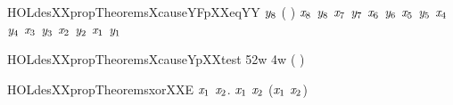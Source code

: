 \begin{SaveVerbatim}{HOLdesXXpropTheoremsXcauseYFpXXeqYY}
     \ensuremath{\HOLFreeVar{y}\sb{\mathrm{8}}} \HOLSymConst{=} ( \HOLSymConst{\HOLTokenExtract{}} )  \HOLSymConst{\HOLTokenImp{}}
        \HOLSymConst{=}
      \ensuremath{\HOLFreeVar{x}\sb{\mathrm{8}}} \ensuremath{\HOLFreeVar{y}\sb{\mathrm{8}}}  \HOLSymConst{\HOLTokenProd{}}  \ensuremath{\HOLFreeVar{x}\sb{\mathrm{7}}} \ensuremath{\HOLFreeVar{y}\sb{\mathrm{7}}}  \HOLSymConst{\HOLTokenProd{}}  \ensuremath{\HOLFreeVar{x}\sb{\mathrm{6}}} \ensuremath{\HOLFreeVar{y}\sb{\mathrm{6}}}  \HOLSymConst{\HOLTokenProd{}}
      \ensuremath{\HOLFreeVar{x}\sb{\mathrm{5}}} \ensuremath{\HOLFreeVar{y}\sb{\mathrm{5}}}  \HOLSymConst{\HOLTokenProd{}}  \ensuremath{\HOLFreeVar{x}\sb{\mathrm{4}}} \ensuremath{\HOLFreeVar{y}\sb{\mathrm{4}}}  \HOLSymConst{\HOLTokenProd{}}  \ensuremath{\HOLFreeVar{x}\sb{\mathrm{3}}} \ensuremath{\HOLFreeVar{y}\sb{\mathrm{3}}}  \HOLSymConst{\HOLTokenProd{}}
      \ensuremath{\HOLFreeVar{x}\sb{\mathrm{2}}} \ensuremath{\HOLFreeVar{y}\sb{\mathrm{2}}}  \HOLSymConst{\HOLTokenProd{}}  \ensuremath{\HOLFreeVar{x}\sb{\mathrm{1}}} \ensuremath{\HOLFreeVar{y}\sb{\mathrm{1}}} 
\end{SaveVerbatim}
\newcommand{\HOLdesXXpropTheoremsXcauseYFpXXeqYY}{\UseVerbatim{HOLdesXXpropTheoremsXcauseYFpXXeqYY}}
\begin{SaveVerbatim}{HOLdesXXpropTheoremsXcauseYpXXtest}
\HOLTokenTurnstile{}  52w 4w  ( \HOLSymConst{/} )
\end{SaveVerbatim}
\newcommand{\HOLdesXXpropTheoremsXcauseYpXXtest}{\UseVerbatim{HOLdesXXpropTheoremsXcauseYpXXtest}}
\begin{SaveVerbatim}{HOLdesXXpropTheoremsxorXXE}
\HOLTokenTurnstile{} \HOLSymConst{\HOLTokenForall{}}\ensuremath{\HOLBoundVar{x}\sb{\mathrm{1}}} \ensuremath{\HOLBoundVar{x}\sb{\mathrm{2}}}.  \ensuremath{\HOLBoundVar{x}\sb{\mathrm{1}}} \HOLSymConst{\HOLTokenEor{}}  \ensuremath{\HOLBoundVar{x}\sb{\mathrm{2}}} \HOLSymConst{=}  (\ensuremath{\HOLBoundVar{x}\sb{\mathrm{1}}} \HOLSymConst{\HOLTokenEor{}} \ensuremath{\HOLBoundVar{x}\sb{\mathrm{2}}})
\end{SaveVerbatim}
\newcommand{\HOLdesXXpropTheoremsxorXXE}{\UseVerbatim{HOLdesXXpropTheoremsxorXXE}}
